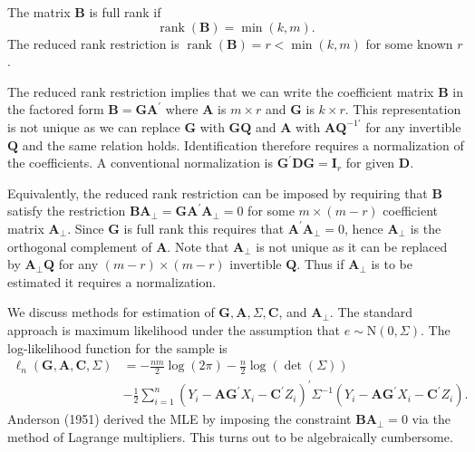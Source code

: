 \documentclass[10pt]{article}
\begin{document}
The matrix $\boldsymbol{B}$ is full rank if
$$
\operatorname{rank}(\boldsymbol{B})=\min (k, m) .
$$
The reduced rank restriction is $\operatorname{rank}(\boldsymbol{B})=r<\min (k, m)$ for some known $r$.

The reduced rank restriction implies that we can write the coefficient matrix $\boldsymbol{B}$ in the factored form $\boldsymbol{B}=\boldsymbol{G} \boldsymbol{A}^{\prime}$ where $\boldsymbol{A}$ is $m \times r$ and $\boldsymbol{G}$ is $k \times r$. This representation is not unique as we can replace $\boldsymbol{G}$ with $\boldsymbol{G} \boldsymbol{Q}$ and $\boldsymbol{A}$ with $\boldsymbol{A} \boldsymbol{Q}^{-1 \prime}$ for any invertible $\boldsymbol{Q}$ and the same relation holds. Identification therefore requires a normalization of the coefficients. A conventional normalization is $\boldsymbol{G}^{\prime} \boldsymbol{D} \boldsymbol{G}=\boldsymbol{I}_{r}$ for given $\boldsymbol{D}$.

Equivalently, the reduced rank restriction can be imposed by requiring that $\boldsymbol{B}$ satisfy the restriction $\boldsymbol{B} \boldsymbol{A}_{\perp}=\boldsymbol{G} \boldsymbol{A}^{\prime} \boldsymbol{A}_{\perp}=0$ for some $m \times(m-r)$ coefficient matrix $\boldsymbol{A}_{\perp}$. Since $\boldsymbol{G}$ is full rank this requires that $\boldsymbol{A}^{\prime} \boldsymbol{A}_{\perp}=0$, hence $\boldsymbol{A}_{\perp}$ is the orthogonal complement of $\boldsymbol{A}$. Note that $\boldsymbol{A}_{\perp}$ is not unique as it can be replaced by $\boldsymbol{A}_{\perp} \boldsymbol{Q}$ for any $(m-r) \times(m-r)$ invertible $\boldsymbol{Q}$. Thus if $\boldsymbol{A}_{\perp}$ is to be estimated it requires a normalization.

We discuss methods for estimation of $\boldsymbol{G}, \boldsymbol{A}, \Sigma, \boldsymbol{C}$, and $\boldsymbol{A}_{\perp}$. The standard approach is maximum likelihood under the assumption that $e \sim \mathrm{N}(0, \Sigma)$. The log-likelihood function for the sample is
$$
\begin{aligned}
\ell_{n}(\boldsymbol{G}, \boldsymbol{A}, \boldsymbol{C}, \Sigma) &=-\frac{n m}{2} \log (2 \pi)-\frac{n}{2} \log (\operatorname{det}(\Sigma)) \\
&-\frac{1}{2} \sum_{i=1}^{n}\left(Y_{i}-\boldsymbol{A} \boldsymbol{G}^{\prime} X_{i}-\boldsymbol{C}^{\prime} Z_{i}\right)^{\prime} \Sigma^{-1}\left(Y_{i}-\boldsymbol{A} \boldsymbol{G}^{\prime} X_{i}-\boldsymbol{C}^{\prime} Z_{i}\right) .
\end{aligned}
$$
Anderson (1951) derived the MLE by imposing the constraint $\boldsymbol{B} \boldsymbol{A}_{\perp}=0$ via the method of Lagrange multipliers. This turns out to be algebraically cumbersome.
\end{document}
